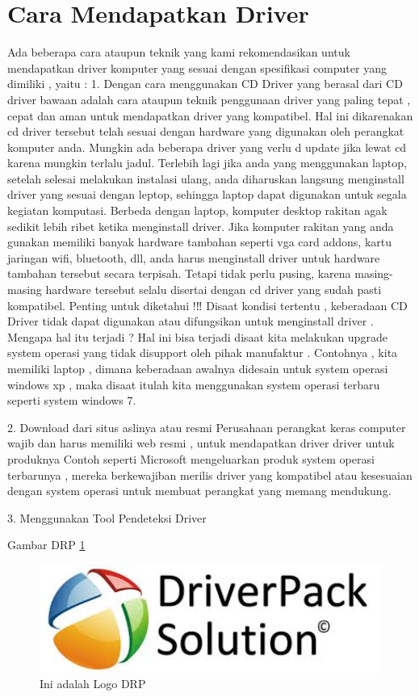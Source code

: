 \section{Cara Mendapatkan Driver}
Ada beberapa cara ataupun teknik yang kami rekomendasikan untuk mendapatkan driver komputer yang sesuai dengan spesifikasi computer yang dimiliki , yaitu :
1.	Dengan cara menggunakan CD 
Driver yang berasal dari CD driver bawaan adalah cara ataupun teknik penggunaan driver yang paling tepat , cepat dan aman untuk mendapatkan driver yang kompatibel.
Hal ini dikarenakan cd driver tersebut telah sesuai dengan hardware yang digunakan oleh perangkat komputer anda. 
Mungkin ada beberapa driver yang verlu d update jika lewat cd karena mungkin terlalu jadul.
Terlebih lagi jika anda yang menggunakan laptop, setelah selesai melakukan instalasi ulang, anda diharuskan langsung menginstall driver yang sesuai dengan leptop, sehingga laptop dapat digunakan untuk segala kegiatan komputasi.
Berbeda dengan laptop, komputer desktop rakitan agak sedikit lebih ribet ketika menginstall driver.
Jika komputer rakitan yang anda gunakan memiliki banyak hardware tambahan seperti vga card addons, kartu jaringan wifi, bluetooth, dll, anda harus menginstall driver untuk hardware tambahan tersebut secara terpisah.
Tetapi tidak perlu pusing, karena masing-masing hardware tersebut selalu disertai dengan cd driver yang sudah pasti kompatibel.
Penting untuk diketahui !‼
Disaat kondisi tertentu  , keberadaan CD Driver tidak dapat digunakan atau difungsikan untuk menginstall driver . Mengapa hal itu terjadi ? Hal ini bisa terjadi disaat kita melakukan upgrade system operasi yang tidak disupport oleh pihak manufaktur . Contohnya , kita memiliki laptop , dimana keberadaan awalnya didesain untuk system operasi windows xp , maka disaat itulah kita menggunakan system operasi terbaru seperti system windows 7.

2. Download dari situs aslinya atau resmi
Perusahaan perangkat keras computer wajib dan harus memiliki web resmi , untuk mendapatkan driver driver untuk produknya
Contoh seperti Microsoft mengeluarkan produk system operasi terbarunya , mereka berkewajiban merilis driver yang kompatibel atau kesesuaian dengan system operasi untuk membuat perangkat yang memang mendukung.

3. Menggunakan Tool Pendeteksi Driver 

Gambar DRP \ref{drp}

  \begin{figure}[ht]
  \centerline{\includegraphics[width=1\textwidth]{../figures/drp.jpg}}
  \caption{Ini adalah Logo DRP}
  \label{drp}
  \end{figure}

